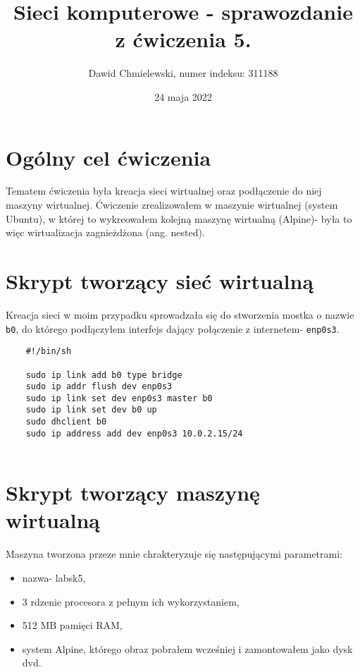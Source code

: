 \documentclass[a4paper,11pt]{article}
\begin{document}
\title{ Sieci komputerowe - sprawozdanie z ćwiczenia 5. }
\author{ Dawid Chmielewski, numer indeksu: 311188 }
\date{24 maja 2022}


\section{Ogólny cel ćwiczenia}

Tematem ćwiczenia była kreacja sieci wirtualnej oraz podłączenie do niej maszyny wirtualnej. Ćwiczenie zrealizowałem w maszynie wirtualnej (system Ubuntu), w której to wykreowałem kolejną maszynę wirtualną (Alpine)- była to więc wirtualizacja zagnieżdżona (ang. nested).

\section{Skrypt tworzący sieć wirtualną}
Kreacja sieci w moim przypadku sprowadzała się do stworzenia mostka o nazwie {\tt b0}, do którego podłączyłem interfejs dający połączenie z internetem- {\tt enp0s3}.

\begin{verbatim}
    #!/bin/sh
    
    sudo ip link add b0 type bridge
    sudo ip addr flush dev enp0s3
    sudo ip link set dev enp0s3 master b0
    sudo ip link set dev b0 up
    sudo dhclient b0
    sudo ip address add dev enp0s3 10.0.2.15/24
    
\end{verbatim}

\section{Skrypt tworzący maszynę wirtualną}

Maszyna tworzona przeze mnie chrakteryzuje się następującymi parametrami: 
\begin{itemize}

    \item nazwa- labsk5,

    \item 3 rdzenie procesora z pełnym ich wykorzystaniem,
    
    \item 512 MB pamięci RAM,
    
    \item system Alpine, którego obraz pobrałem wcześniej i zamontowałem jako dysk dvd.

\end{itemize}
\end{document}
